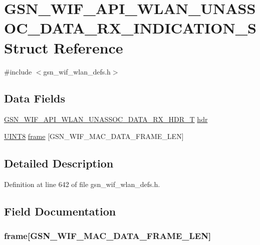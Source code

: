 \hypertarget{a00309}{
\section{GSN\_\-WIF\_\-API\_\-WLAN\_\-UNASSOC\_\-DATA\_\-RX\_\-INDICATION\_\-S Struct Reference}
\label{a00309}
}


{\ttfamily \#include $<$gsn\_\-wif\_\-wlan\_\-defs.h$>$}

\subsection*{Data Fields}
\begin{DoxyCompactItemize}
\item 
\hyperlink{a00308}{GSN\_\-WIF\_\-API\_\-WLAN\_\-UNASSOC\_\-DATA\_\-RX\_\-HDR\_\-T} \hyperlink{a00309_a8b74d10ee4154e2bb6bf61685c529910}{hdr}
\item 
\hyperlink{a00660_gab27e9918b538ce9d8ca692479b375b6a}{UINT8} \hyperlink{a00309_a8b42cbea17f4b140d0757b6255899406}{frame} \mbox{[}GSN\_\-WIF\_\-MAC\_\-DATA\_\-FRAME\_\-LEN\mbox{]}
\end{DoxyCompactItemize}


\subsection{Detailed Description}


Definition at line 642 of file gsn\_\-wif\_\-wlan\_\-defs.h.



\subsection{Field Documentation}
\hypertarget{a00309_a8b42cbea17f4b140d0757b6255899406}{
\subsubsection[{frame}]{ {\bf frame}\mbox{[}GSN\_\-WIF\_\-MAC\_\-DATA\_\-FRAME\_\-LEN\mbox{]}}}
\label{a00309_a8b42cbea17f4b140d0757b6255899406}


